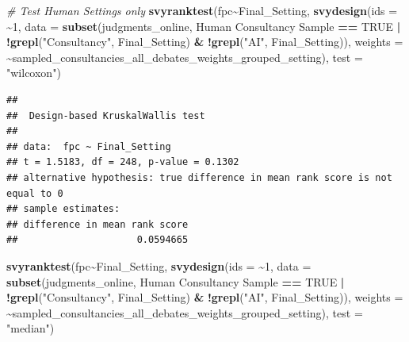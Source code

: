 \documentclass[
]{article}
\newenvironment{Shaded}{\begin{snugshade}}{\end{snugshade}}
\newcommand{\AttributeTok}[1]{\textcolor[rgb]{0.13,0.29,0.53}{#1}}
\newcommand{\CommentTok}[1]{\textcolor[rgb]{0.56,0.35,0.01}{\textit{#1}}}
\newcommand{\ConstantTok}[1]{\textcolor[rgb]{0.56,0.35,0.01}{#1}}
\newcommand{\DecValTok}[1]{\textcolor[rgb]{0.00,0.00,0.81}{#1}}
\newcommand{\FunctionTok}[1]{\textcolor[rgb]{0.13,0.29,0.53}{\textbf{#1}}}
\newcommand{\NormalTok}[1]{#1}
\newcommand{\SpecialCharTok}[1]{\textcolor[rgb]{0.81,0.36,0.00}{\textbf{#1}}}
\newcommand{\StringTok}[1]{\textcolor[rgb]{0.31,0.60,0.02}{#1}}
\begin{document}
\begin{Shaded}
\begin{Highlighting}[]
\CommentTok{\# Test Human Settings only}
\FunctionTok{svyranktest}\NormalTok{(fpc}\SpecialCharTok{\textasciitilde{}}\NormalTok{Final\_Setting, }
            \FunctionTok{svydesign}\NormalTok{(}\AttributeTok{ids =} \SpecialCharTok{\textasciitilde{}}\DecValTok{1}\NormalTok{, }\AttributeTok{data =} \FunctionTok{subset}\NormalTok{(judgments\_online, }\StringTok{\textasciigrave{}}\AttributeTok{Human Consultancy Sample}\StringTok{\textasciigrave{}} \SpecialCharTok{==} \ConstantTok{TRUE} \SpecialCharTok{|} \SpecialCharTok{!}\FunctionTok{grepl}\NormalTok{(}\StringTok{"Consultancy"}\NormalTok{, Final\_Setting) }\SpecialCharTok{\&} \SpecialCharTok{!}\FunctionTok{grepl}\NormalTok{(}\StringTok{"AI"}\NormalTok{, Final\_Setting)), }\AttributeTok{weights =} \SpecialCharTok{\textasciitilde{}}\NormalTok{sampled\_consultancies\_all\_debates\_weights\_grouped\_setting),}
            \AttributeTok{test =} \StringTok{"wilcoxon"}\NormalTok{)}
\end{Highlighting}
\end{Shaded}

\begin{verbatim}
## 
##  Design-based KruskalWallis test
## 
## data:  fpc ~ Final_Setting
## t = 1.5183, df = 248, p-value = 0.1302
## alternative hypothesis: true difference in mean rank score is not equal to 0
## sample estimates:
## difference in mean rank score 
##                     0.0594665
\end{verbatim}

\begin{Shaded}
\begin{Highlighting}[]
\FunctionTok{svyranktest}\NormalTok{(fpc}\SpecialCharTok{\textasciitilde{}}\NormalTok{Final\_Setting, }
            \FunctionTok{svydesign}\NormalTok{(}\AttributeTok{ids =} \SpecialCharTok{\textasciitilde{}}\DecValTok{1}\NormalTok{, }\AttributeTok{data =} \FunctionTok{subset}\NormalTok{(judgments\_online, }\StringTok{\textasciigrave{}}\AttributeTok{Human Consultancy Sample}\StringTok{\textasciigrave{}} \SpecialCharTok{==} \ConstantTok{TRUE} \SpecialCharTok{|} \SpecialCharTok{!}\FunctionTok{grepl}\NormalTok{(}\StringTok{"Consultancy"}\NormalTok{, Final\_Setting) }\SpecialCharTok{\&} \SpecialCharTok{!}\FunctionTok{grepl}\NormalTok{(}\StringTok{"AI"}\NormalTok{, Final\_Setting)), }\AttributeTok{weights =} \SpecialCharTok{\textasciitilde{}}\NormalTok{sampled\_consultancies\_all\_debates\_weights\_grouped\_setting),}
            \AttributeTok{test =} \StringTok{"median"}\NormalTok{)}
\end{Highlighting}
\end{Shaded}
\end{document}
